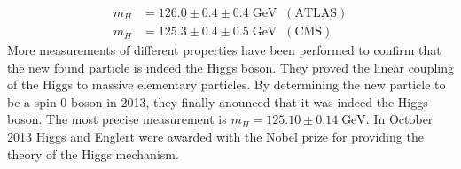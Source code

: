 \begin{align*}
	m_H &= 126.0 \pm 0.4\pm0.4 \;\si{\GeV} \;\;(\text{ATLAS})\\
	m_H &= 125.3 \pm 0.4\pm0.5 \;\si{\GeV} \;\; (\text{CMS})
\end{align*}
More measurements of different properties have been performed to confirm that the new found particle is indeed the Higgs boson. They proved the linear coupling of the Higgs to massive elementary particles. By determining the new particle to be a spin 0 boson in 2013, they finally anounced that it was indeed the Higgs boson. The most precise measurement is $m_H = 125.10\pm0.14\;\si{\GeV}$. In October 2013 Higgs and Englert were awarded with the Nobel prize for providing the theory of the Higgs mechanism.
